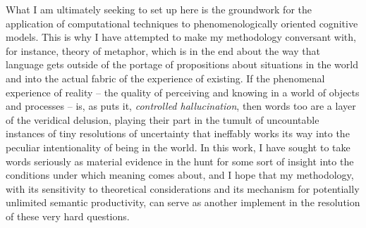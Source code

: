 What I am ultimately seeking to set up here is the groundwork for the application of computational techniques to phenomenologically oriented cognitive models.  This is why I have attempted to make my methodology conversant with, for instance,  theory of metaphor, which is in the end about the way that language gets outside of the portage of propositions about situations in the world and into the actual fabric of the experience of existing.  If the phenomenal experience of reality -- the quality of perceiving and knowing in a world of objects and processes -- is, as \cite{Clark2016} puts it, \emph{controlled hallucination}, then words too are a layer of the veridical delusion, playing their part in the tumult of uncountable instances of tiny resolutions of uncertainty that ineffably works its way into the peculiar intentionality of being in the world.  In this work, I have sought to take words seriously as material evidence in the hunt for some sort of insight into the conditions under which meaning comes about, and I hope that my methodology, with its sensitivity to theoretical considerations and its mechanism for potentially unlimited semantic productivity, can serve as another implement in the resolution of these very hard questions.

